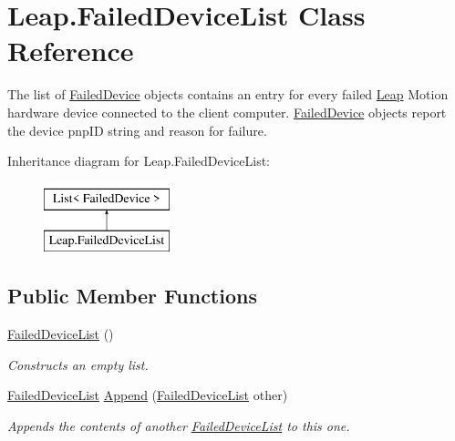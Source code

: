 \hypertarget{class_leap_1_1_failed_device_list}{}\section{Leap.\+Failed\+Device\+List Class Reference}
\label{class_leap_1_1_failed_device_list}


The list of \mbox{\hyperlink{class_leap_1_1_failed_device}{Failed\+Device}} objects contains an entry for every failed \mbox{\hyperlink{namespace_leap}{Leap}} Motion hardware device connected to the client computer. \mbox{\hyperlink{class_leap_1_1_failed_device}{Failed\+Device}} objects report the device pnp\+ID string and reason for failure.  


Inheritance diagram for Leap.\+Failed\+Device\+List\+:\begin{figure}[H]
\begin{center}
\leavevmode
\includegraphics[height=2.000000cm]{class_leap_1_1_failed_device_list}
\end{center}
\end{figure}
\subsection*{Public Member Functions}
\begin{DoxyCompactItemize}
\item 
\mbox{\hyperlink{class_leap_1_1_failed_device_list_a52c703c8c2eee1e7a380c2fb383090d6}{Failed\+Device\+List}} ()
\begin{DoxyCompactList}\small\item\em Constructs an empty list. \end{DoxyCompactList}\item 
\mbox{\hyperlink{class_leap_1_1_failed_device_list}{Failed\+Device\+List}} \mbox{\hyperlink{class_leap_1_1_failed_device_list_a718993fa65c5ce4e646cd555f6753f5c}{Append}} (\mbox{\hyperlink{class_leap_1_1_failed_device_list}{Failed\+Device\+List}} other)
\begin{DoxyCompactList}\small\item\em Appends the contents of another \mbox{\hyperlink{class_leap_1_1_failed_device_list}{Failed\+Device\+List}} to this one. \end{DoxyCompactList}\end{DoxyCompactItemize}
